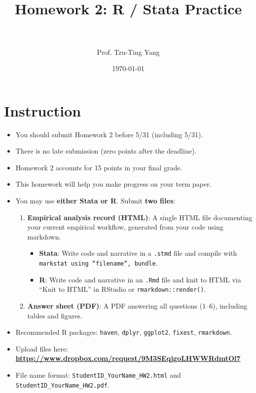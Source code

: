 \documentclass[paper=a4, fontsize=11pt]{scrartcl}
\title{
\normalfont \normalsize
\horrule{0.5pt} \\[0.4cm]
\huge Homework 2: R / Stata Practice \\
\horrule{2pt} \\[0.5cm]
}
\author{Prof. Tzu-Ting Yang}
\date{\normalsize\today}
\begin{document}
\maketitle




\section*{Instruction}

\begin{itemize}
\item[\textbullet] You should submit Homework 2 before 5/31 (including 5/31).
\item[\textbullet] There is no late submission (zero points after the deadline).
\item[\textbullet] Homework 2 accounts for 15 points in your final grade.
\item[\textbullet] This homework will help you make progress on your term paper.
\item[\textbullet] You may use \textbf{either Stata or R}. Submit \textbf{two files}:
  \begin{enumerate}
    \item \textbf{Empirical analysis record (HTML)}: A single HTML file documenting your current empirical workflow, generated from your code using markdown.
    \begin{itemize}
      \item \textbf{Stata}: Write code and narrative in a \texttt{.stmd} file and compile with \texttt{markstat using ``filename'', bundle}.
      \item \textbf{R}: Write code and narrative in an \texttt{.Rmd} file and knit to HTML via ``Knit to HTML'' in RStudio or \texttt{rmarkdown::render()}.
    \end{itemize}
    \item \textbf{Answer sheet (PDF)}: A PDF answering all questions (1--6), including tables and figures.
  \end{enumerate}
\item[\textbullet] Recommended R packages: \texttt{haven}, \texttt{dplyr}, \texttt{ggplot2}, \texttt{fixest}, \texttt{rmarkdown}.
\item[\textbullet] Upload files here: \textbf{\url{https://www.dropbox.com/request/9M3SEqjgoLHWWRdmtOl7}}
\item[\textbullet] File name format: \texttt{StudentID\_YourName\_HW2.html} and \texttt{StudentID\_YourName\_HW2.pdf}.
\end{itemize}
\end{document}

